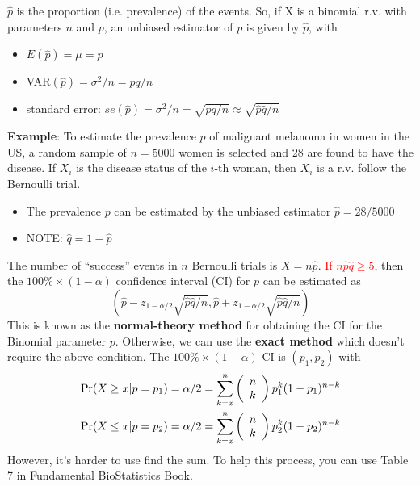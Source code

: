 $\hat{p}$ is the proportion (i.e. prevalence) of the events. So, if X
is a binomial r.v. with parameters $n$ and $p$, an unbiased estimator
of $p$ is given by $\hat{p}$, with
\begin{itemize}
\item $E(\hat{p}) = \mu = p$
\item VAR$(\hat{p})=\sigma^2/n = pq/n$
\item standard error: $se(\hat{p})=\sigma^2/n = \sqrt{pq/n} \approx  \sqrt{\hat{p}\hat{q}/n}$
\end{itemize}

{\bf Example}: To estimate the prevalence $p$ of malignant melanoma in
women in the US, a random sample of $n=5000$ women is selected and 28
are found to have the disease. If $X_i$ is the disease status of the
$i$-th woman, then $X_i$ is a r.v. follow the Bernoulli trial. 
\begin{itemize}
\item The prevalence $p$ can be estimated by the unbiased estimator
  $\hat{p} = 28/5000$
\item NOTE: $\hat{q} = 1-\hat{p}$
\end{itemize}

The number of ``success'' events in $n$ Bernoulli trials is
$X=n\hat{p}$. \textcolor{red}{If $n\hat{p}\hat{q} \ge 5$}, then the
$100\%\times(1-\alpha)$ confidence interval (CI) for $p$ can be
estimated as
\begin{equation}
  \label{eq:51}
  \left( \hat{p} - z_{1-\alpha/2}\sqrt{\hat{p}\hat{q}/n}, \hat{p} +
    z_{1-\alpha/2}\sqrt{\hat{p}\hat{q}/n} \right)
\end{equation}
This is known as the {\bf normal-theory method} for obtaining the CI
for the Binomial parameter $p$. Otherwise, we can use the
{\bf exact method} which doesn't require the above condition. The $100\%\times(1-\alpha)$ CI is
$(p_1,p_2)$ with
\begin{equation}
  \label{eq:52}
  \begin{split}
    \text{Pr}(X\ge x|p=p_1) = \alpha/2 = \sum^n_{k=x}\left(
      \begin{array}{c}
        n \\k
      \end{array}
\right) p_1^k (1-p_1)^{n-k} \\
\text{Pr}(X\le x|p=p_2) = \alpha/2 = \sum^n_{k=x}\left(
  \begin{array}{c}
    n \\k
  \end{array}
\right) p_2^k (1-p_2)^{n-k} \\
  \end{split}
\end{equation}
However, it's harder to use find the sum. To help this process, you
can use Table 7 in Fundamental BioStatistics Book. 

